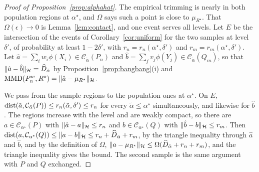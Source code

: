 \begin{proof}[Proof of Proposition~\ref{prop:alphahat}]
The empirical trimming is nearly in both population regions at $\alpha^\star$, and $\Omega$ says such a
point is close to $\mu_{R^\star}$. That $\Omega(\epsilon)\to0$ is Lemma~\ref{lem:contact}, and one event serves all
levels. Let $E$ be the intersection of the events of
Corollary~\ref{cor:uniform} for the two samples at level $\delta'$, of probability at least $1-2\delta'$, with
$r_n=r_n(\alpha^\star,\delta')$ and $r_m=r_m(\alpha^\star,\delta')$. Let $\hat a=\sum_iw_i\phi(X_i)\in\mathcal C_{\tilde\alpha}(P_n)$ and $\hat b=\sum_jv_j\phi(Y_j)\in\mathcal C_{\tilde\alpha}(Q_m)$,
so that $\|\hat a-\hat b\|_{\mathcal{H}}=\widehat D_{\tilde\alpha}$ by Proposition~\ref{prop:bangbang}(i) and
$\operatorname{MMD}(P_n^w,R^\star)=\|\hat a-\mu_{R^\star}\|_{\mathcal{H}}$.

We pass from the sample regions to the population ones at $\alpha^\star$. On $E$, $\operatorname{dist}(\hat a,\mathcal C_{\tilde\alpha}(P))
\le r_n(\tilde\alpha,\delta')\le r_n$ for every $\tilde\alpha\le\alpha^\star$ simultaneously, and likewise for $\hat b$.
The regions increase with the level and are weakly compact, so there are $a\in\mathcal C_{\alpha^\star}(P)$ with
$\|\hat a-a\|_{\mathcal{H}}\le r_n$ and $b\in\mathcal C_{\alpha^\star}(Q)$ with $\|\hat b-b\|_{\mathcal{H}}\le r_m$. Then $\operatorname{dist}(a,\mathcal C_{\alpha^\star}(Q))\le\|a-b\|_{\mathcal{H}}\le r_n+\widehat D_{\tilde\alpha}+r_m$, by the
triangle inequality through $\hat a$ and $\hat b$, and by the definition of $\Omega$,
$\|a-\mu_{R^\star}\|_{\mathcal{H}}\le\Omega(\widehat D_{\tilde\alpha}+r_n+r_m)$, and the triangle inequality gives the bound.
The second sample is the same argument with $P$ and $Q$ exchanged.
\end{proof}


